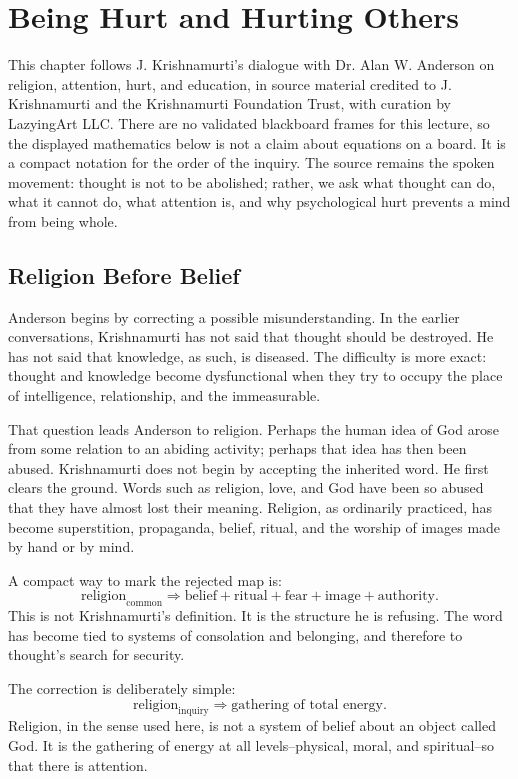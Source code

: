 \chapter{Being Hurt and Hurting Others}

This chapter follows J. Krishnamurti's dialogue with Dr. Alan W. Anderson on religion, attention, hurt, and education, in source material credited to J. Krishnamurti and the Krishnamurti Foundation Trust, with curation by LazyingArt LLC. There are no validated blackboard frames for this lecture, so the displayed mathematics below is not a claim about equations on a board. It is a compact notation for the order of the inquiry. The source remains the spoken movement: thought is not to be abolished; rather, we ask what thought can do, what it cannot do, what attention is, and why psychological hurt prevents a mind from being whole.

\section{Religion Before Belief}

Anderson begins by correcting a possible misunderstanding. In the earlier conversations, Krishnamurti has not said that thought should be destroyed. He has not said that knowledge, as such, is diseased. The difficulty is more exact: thought and knowledge become dysfunctional when they try to occupy the place of intelligence, relationship, and the immeasurable.

That question leads Anderson to religion. Perhaps the human idea of God arose from some relation to an abiding activity; perhaps that idea has then been abused. Krishnamurti does not begin by accepting the inherited word. He first clears the ground. Words such as religion, love, and God have been so abused that they have almost lost their meaning. Religion, as ordinarily practiced, has become superstition, propaganda, belief, ritual, and the worship of images made by hand or by mind.

A compact way to mark the rejected map is:
\begin{equation}
\text{religion}_{\text{common}}
\Rightarrow
\text{belief}+\text{ritual}+\text{fear}+\text{image}+\text{authority}.
\end{equation}
This is not Krishnamurti's definition. It is the structure he is refusing. The word has become tied to systems of consolation and belonging, and therefore to thought's search for security.

The correction is deliberately simple:
\begin{equation}
\text{religion}_{\text{inquiry}}
\Rightarrow
\text{gathering of total energy}.
\end{equation}
Religion, in the sense used here, is not a system of belief about an object called God. It is the gathering of energy at all levels--physical, moral, and spiritual--so that there is attention.

